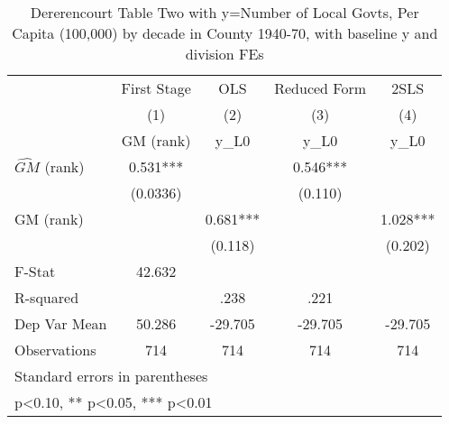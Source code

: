 \begin{table}[htbp]\centering
\def\sym#1{\ifmmode^{#1}\else\(^{#1}\)\fi}
\caption{Dererencourt Table Two with y=Number of Local Govts, Per Capita (100,000) by decade in County 1940-70, with baseline y and division FEs}
\begin{tabular}{l*{4}{c}}
\toprule
                    & First Stage   &         OLS   &Reduced Form   &        2SLS   \\
                    &\multicolumn{1}{c}{(1)}&\multicolumn{1}{c}{(2)}&\multicolumn{1}{c}{(3)}&\multicolumn{1}{c}{(4)}\\
                    &\multicolumn{1}{c}{GM  (rank)}&\multicolumn{1}{c}{y\_L0}&\multicolumn{1}{c}{y\_L0}&\multicolumn{1}{c}{y\_L0}\\
\midrule
$\hat{GM}$ (rank)   &       0.531***&               &       0.546***&               \\
                    &    (0.0336)   &               &     (0.110)   &               \\
\addlinespace
GM  (rank)          &               &       0.681***&               &       1.028***\\
                    &               &     (0.118)   &               &     (0.202)   \\
\midrule
F-Stat              &      42.632   &               &               &               \\
R-squared           &               &        .238   &        .221   &               \\
Dep Var Mean        &      50.286   &     -29.705   &     -29.705   &     -29.705   \\
Observations        &         714   &         714   &         714   &         714   \\
\bottomrule
\multicolumn{5}{l}{\footnotesize Standard errors in parentheses}\\
\multicolumn{5}{l}{\footnotesize * p<0.10, ** p<0.05, *** p<0.01}\\
\end{tabular}
\end{table}
